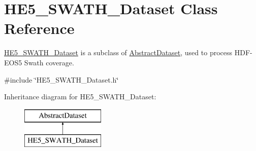 \hypertarget{classHE5__SWATH__Dataset}{
\section{HE5\_\-SWATH\_\-Dataset Class Reference}
\label{classHE5__SWATH__Dataset}
}


\hyperlink{classHE5__SWATH__Dataset}{HE5\_\-SWATH\_\-Dataset} is a subclass of \hyperlink{classAbstractDataset}{AbstractDataset}, used to process HDF-\/EOS5 Swath coverage.  




{\ttfamily \#include \char`\"{}HE5\_\-SWATH\_\-Dataset.h\char`\"{}}

Inheritance diagram for HE5\_\-SWATH\_\-Dataset:\begin{figure}[H]
\begin{center}
\leavevmode
\includegraphics[height=2.000000cm]{classHE5__SWATH__Dataset}
\end{center}
\end{figure}
